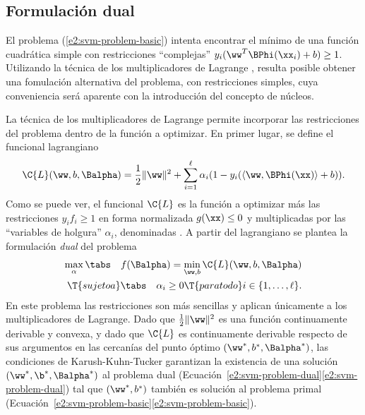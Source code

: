 %
%
\subsection{Formulación dual}
%
El problema (\ref{e2:svm-problem-basic}) intenta encontrar el mínimo
de una función cuadrática simple con restricciones ``complejas''
${y}_i(\ww^T\BPhi(\xx_i)+b)\geq{}1$.  Utilizando la técnica de los
multiplicadores de Lagrange \cite{bottou,kkt}, resulta posible obtener
una fomulación alternativa del problema, con restricciones simples,
cuya conveniencia será aparente con la introducción del concepto de
núcleos.

La técnica de los multiplicadores de Lagrange permite incorporar las
restricciones del problema dentro de la función a optimizar.  En
primer lugar, se define el funcional lagrangiano
%
\begin{align}\label{e2:lagrangian}
  \C{L}(\ww,b,\Balpha) = \frac{1}{2} \|\ww\|^2 + \sum_{i=1}^{\ell}
  \alpha_i (1-y_i(\langle\ww,\BPhi(\xx)\rangle+b)).
\end{align}
%
Como se puede ver, el funcional $\C{L}$ es la función a optimizar más
las restricciones ${y}_if_i\geq{}1$ en forma normalizada $g(\xx)\leq0$
y multiplicadas por las ``variables de holgura'' $\alpha_i$,
denominadas . A partir del lagrangiano
se plantea la formulación \emph{dual} del problema
%
\begin{align}\label{e2:svm-problem-dual}
  \begin{split}
    \max_\alpha \tabs\quad f(\Balpha) = \min_{\ww,b} \C{L}(\ww,b,\Balpha)\\
    \T{sujeto a} \tabs\quad \alpha_i \geq 0\T{ para todo } i\in\{1,\ldots,\ell\}.
  \end{split}
\end{align}
%
En este problema las restricciones son más sencillas y
aplican únicamente a los multiplicadores de Lagrange. 
Dado que $\frac{1}{2}\|\ww\|^2$ es una función continuamente derivable
y convexa, y dado que $\C{L}$ es continuamente derivable respecto de
sus argumentos en las cercanías del punto óptimo
$(\ww^*,b^*,\Balpha^*)$, las condiciones de Karush-Kuhn-Tucker
\cite{kkt} garantizan la existencia de una solución
$(\ww^*,\b^*,\Balpha^*)$ al problema dual
(\iflatexml{}Ecuación~\ref{e2:svm-problem-dual}\else\autoref{e2:svm-problem-dual}\fi)
tal que $(\ww^*,b^*)$ también es solución al problema primal
(\iflatexml{}Ecuación~\ref{e2:svm-problem-basic}\else\autoref{e2:svm-problem-basic}\fi).

